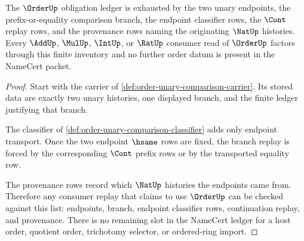 \begin{theorem}
\label{thm:order-obligation-prefix-ledger-exhaustion}
The $\OrderUp$ obligation ledger is exhausted by the two unary endpoints, the prefix-or-equality comparison branch, the endpoint classifier rows, the $\Cont$ replay rows, and the provenance rows naming the originating $\NatUp$ histories. Every $\AddUp$, $\MulUp$, $\IntUp$, or $\RatUp$ consumer read of $\OrderUp$ factors through this finite inventory and no further order datum is present in the NameCert packet.
\end{theorem}
\begin{proof}
Start with the carrier of \autoref{def:order-unary-comparison-carrier}. Its stored data are exactly two unary histories, one displayed branch, and the finite ledger justifying that branch.

The classifier of \autoref{def:order-unary-comparison-classifier} adds only endpoint transport. Once the two endpoint $\hsame$ rows are fixed, the branch replay is forced by the corresponding $\Cont$ prefix rows or by the transported equality row.

The provenance rows record which $\NatUp$ histories the endpoints came from. Therefore any consumer replay that claims to use $\OrderUp$ can be checked against this list: endpoints, branch, endpoint classifier rows, continuation replay, and provenance. There is no remaining slot in the NameCert ledger for a host order, quotient order, trichotomy selector, or ordered-ring import.
\end{proof}

